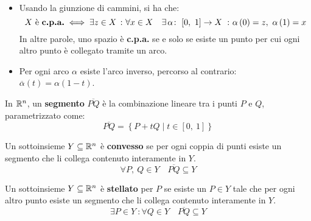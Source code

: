 \begin{observe}~{}\label{giunzionecpa}
	\begin{itemize}
		\item Usando la giunzione di cammini, si ha che:
		\begin{equation*}
			X\text{ è \textbf{c.p.a.}}\iff \exists z\in X\ \colon \forall x\in X\quad
			\exists \funz{\alpha}{\left[0,\ 1\right]}{X}\ \colon \alpha\left(0\right)=z,\ \alpha\left(1\right)=x
		\end{equation*}
		In altre parole, uno spazio è \textbf{c.p.a.} se e solo se esiste un punto per cui ogni altro punto è collegato tramite un arco.
		\item Per ogni arco $\alpha$ esiste l'arco inverso, percorso al contrario: $\overline{\alpha}\left(t\right)=\alpha\left(1-t\right)$.
	\end{itemize}
\end{observe}
\begin{define}
In $\mathbb{R}^n$, un \textbf{segmento} $\overline{PQ}$ è la combinazione lineare tra i punti $P$ e $Q$, parametrizzato come:
\begin{equation}
\overline{PQ}=\left\{P+tQ\mid t\in\left[0,\ 1\right]\right\}
\end{equation}
\end{define}
\begin{define}
	Un sottoinsieme $Y\subseteq\mathbb{R}^n$ è \textbf{convesso} se per ogni coppia di punti esiste un segmento che li collega contenuto interamente in $Y$.
	\begin{equation}
		\forall P,\ Q\in Y\quad \overline{PQ}\subseteq Y
	\end{equation}
\end{define}
\begin{define}
	Un sottoinsieme $Y\subseteq\mathbb{R}^n$ è \textbf{stellato} per $P$ se esiste un $P\in Y$ tale che per ogni altro punto esiste un segmento che li collega contenuto interamente in $Y$.
	\begin{equation}
		\exists P \in Y\ \colon \forall Q\in Y\quad \overline{PQ}\subseteq Y
	\end{equation}
\end{define}
